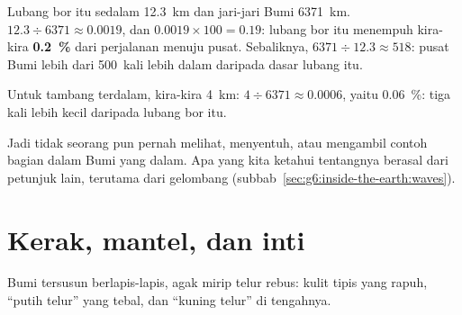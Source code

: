\begin{example}\label{ex:g6:inside-the-earth:kola}
Lubang bor itu sedalam 12.3~km dan jari-jari Bumi 6371~km.
$12.3 \div 6371 \approx 0.0019$, dan $0.0019 \times 100 = 0.19$: lubang bor
itu menempuh kira-kira \textbf{0.2~\%} dari perjalanan menuju pusat.
Sebaliknya, $6371 \div 12.3 \approx 518$: pusat Bumi lebih dari 500~kali
lebih dalam daripada dasar lubang itu.

Untuk tambang terdalam, kira-kira 4~km: $4 \div 6371 \approx 0.0006$, yaitu
0.06~\%: tiga kali lebih kecil daripada lubang bor itu.
\end{example}

Jadi tidak seorang pun pernah melihat, menyentuh, atau mengambil contoh
bagian dalam Bumi yang dalam. Apa yang kita ketahui tentangnya berasal dari
petunjuk lain, terutama dari gelombang 
(subbab~\ref{sec:g6:inside-the-earth:waves}).

\section{Kerak, mantel, dan inti}

Bumi tersusun berlapis-lapis, agak mirip telur rebus: kulit tipis yang
rapuh, ``putih telur'' yang tebal, dan ``kuning telur'' di tengahnya.

